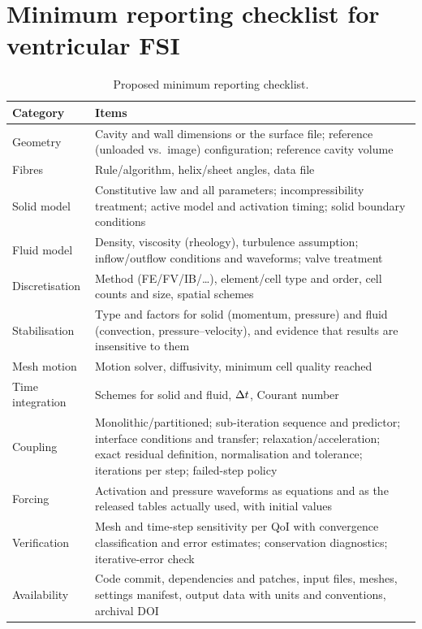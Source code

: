 \section{Minimum reporting checklist for ventricular FSI}\label{app:checklist}

\begin{table}[h]
\centering
\caption{Proposed minimum reporting checklist.}
\label{tab:checklist}
\small
\begin{tabularx}{\linewidth}{lX}
\toprule
Category & Items \\
\midrule
Geometry & Cavity and wall dimensions or the surface file; reference
  (unloaded vs.\ image) configuration; reference cavity volume \\
Fibres & Rule/algorithm, helix/sheet angles, data file \\
Solid model & Constitutive law and all parameters; incompressibility treatment;
  active model and activation timing; solid boundary conditions \\
Fluid model & Density, viscosity (rheology), turbulence assumption;
  inflow/outflow conditions and waveforms; valve treatment \\
Discretisation & Method (FE/FV/IB/\dots), element/cell type and order,
  cell counts and size, spatial schemes \\
Stabilisation & Type and factors for solid (momentum, pressure) and fluid
  (convection, pressure--velocity), and evidence that results are insensitive
  to them \\
Mesh motion & Motion solver, diffusivity, minimum cell quality reached \\
Time integration & Schemes for solid and fluid, $\Delta t$, Courant number \\
Coupling & Monolithic/partitioned; sub-iteration sequence and predictor;
  interface conditions and transfer; relaxation/acceleration; exact residual
  definition, normalisation and tolerance; iterations per step; failed-step
  policy \\
Forcing & Activation and pressure waveforms as equations and as the released
  tables actually used, with initial values \\
Verification & Mesh and time-step sensitivity per QoI with convergence classification and error estimates; conservation diagnostics; iterative-error check \\
Availability & Code commit, dependencies and patches, input files, meshes, settings manifest, output data with units and conventions, archival DOI \\
\bottomrule
\end{tabularx}
\end{table}
